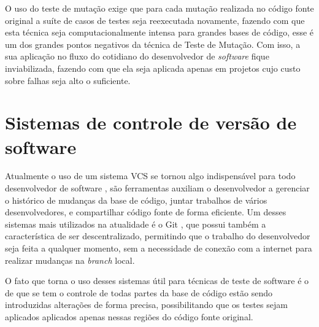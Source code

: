 O uso do teste de mutação exige que para cada mutação realizada no código fonte original a suíte de casos de testes seja reexecutada novamente, fazendo com que esta técnica seja computacionalmente intensa para grandes bases de código, esse é um dos grandes pontos negativos da técnica de Teste de Mutação. Com isso, a sua aplicação no fluxo do cotidiano do desenvolvedor de \textit{software} fique inviabilizada, fazendo com que ela seja aplicada apenas em projetos cujo custo sobre falhas seja alto o suficiente.


\section{Sistemas de controle de versão de software}

Atualmente o uso de um sistema VCS se tornou algo indispensável para todo desenvolvedor de software \cite{git:review}, são ferramentas auxiliam o desenvolvedor a gerenciar o histórico de mudanças da base de código, juntar trabalhos de vários desenvolvedores, e compartilhar código fonte de forma eficiente. Um desses sistemas mais utilizados na atualidade é o Git \cite{git:website}, que possui também a característica de ser descentralizado, permitindo que o trabalho do desenvolvedor seja feita a qualquer momento, sem a necessidade de conexão com a internet para realizar mudanças na \textit{branch} local.

O fato que torna o uso desses sistemas útil para técnicas de teste de software é o de que se tem o controle de todas partes da base de código estão sendo introduzidas alterações de forma precisa, possibilitando que os testes sejam aplicados aplicados apenas nessas regiões do código fonte original.


